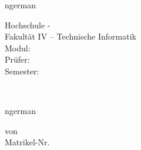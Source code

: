 \begin{titlepage}
  \pagestyle{empty}
  \centering

  \vspace*{0.5cm}
  \begin{otherlanguage*}{ngerman}
    \begin{sffamily} {
        \Large
        Hochschule -\\[1em]
        Fakultät IV -- Technische Informatik\\[0.1em]
        Modul: \modul\\[0.1em]
        Prüfer: \pruefer\\[0.1em]
        Semester: \semester\\[0.1em]
      }
    \end{sffamily}
  \end{otherlanguage*}

  \vspace*{3cm}

  \begin{sffamily}
    \huge \bfseries
    \makeatletter
    \@title
    \makeatother
    \\
  \end{sffamily}

  \vspace*{1cm}

  \begin{otherlanguage*}{ngerman}
    
    \vspace*{3cm}
    
    von\\[0.75em]
    {
      \large
      \textbf{\authorA}\quad Matrikel-Nr. \matrikelnrA\\

      \vspace*{2cm}
      \makeatletter
      \@date
      \makeatother
    }
    \vfill
  \end{otherlanguage*}
\end{titlepage}